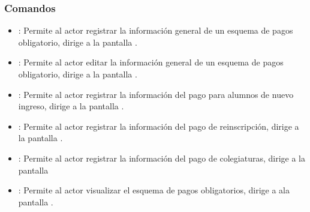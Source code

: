 
\subsubsection{Comandos}

	\begin{itemize}
		\item {}: Permite al actor registrar la información general de un esquema de pagos obligatorio, dirige a la pantalla .
		\item {}: Permite al actor editar la información general de un esquema de pagos obligatorio, dirige a la pantalla .
		\item {}: Permite al actor registrar la información del pago para alumnos de nuevo ingreso, dirige a la pantalla .
		\item {}: Permite al actor registrar la información del pago de reinscripción, dirige a la pantalla .
		\item {}: Permite al actor registrar la información del pago de colegiaturas, dirige a la pantalla 
		\item {}: Permite al actor visualizar el esquema de pagos obligatorios, dirige a ala pantalla .

	\end{itemize}



